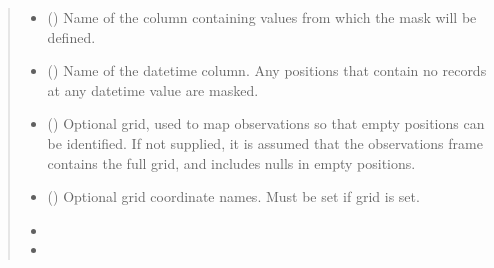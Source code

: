 \documentclass[letterpaper,10pt,english]{sphinxmanual}
\begin{document}
\begin{fulllineitems}
\begin{quote}
\begin{description}
\begin{itemize}
\item {}
\sphinxAtStartPar
{} () \textendash{} Name of the column containing values from which the mask will be
defined.

\item {}
\sphinxAtStartPar
{} (\sphinxstyleliteralemphasis{\sphinxupquote{ | }}) \textendash{} Name of the datetime column. Any positions that contain no records at
any datetime value are masked.

\item {}
\sphinxAtStartPar
{} (\sphinxstyleliteralemphasis{\sphinxupquote{ | }}) \textendash{} Optional grid, used to map observations so that empty positions can be
identified. If not supplied, it is assumed that the observations frame
contains the full grid, and includes nulls in empty positions.

\item {}
\sphinxAtStartPar
{} (\sphinxstyleliteralemphasis{\sphinxupquote{ | }}\sphinxstyleliteralemphasis{\sphinxupquote{{[}}}\sphinxstyleliteralemphasis{\sphinxupquote{{]} }}\sphinxstyleliteralemphasis{\sphinxupquote{| }}) \textendash{} Optional grid coordinate names. Must be set if grid is set.

\end{itemize}

\sphinxAtStartPar
{}

\sphinxAtStartPar
\begin{itemize}
\item {}
\sphinxAtStartPar
{}

\item {}
\sphinxAtStartPar
{}

\end{itemize}


\end{description}\end{quote}

\end{fulllineitems}
\end{document}
